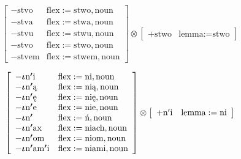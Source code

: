 \documentclass{article}
\begin{document}
\begin{scriptsize}\[
\left[\begin{array}{ll}
-\text{stvo} & \text{flex}:=\text{stwo}, \text{noun}\\
-\text{stva} & \text{flex}:=\text{stwa}, \text{noun}\\
-\text{stvu} & \text{flex}:=\text{stwu}, \text{noun}\\
-\text{stvo} & \text{flex}:=\text{stwo}, \text{noun}\\
-\text{stvem} & \text{flex}:=\text{stwem}, \text{noun}
\end{array}\right] \otimes \left[\begin{array}{ll}
+\text{stwo} & \text{lemma}:=\text{stwo}
\end{array}\right]
\]\end{scriptsize}

\begin{scriptsize}\[
\left[\begin{array}{ll}
-\text{\boldmath$\iota$n$'$i} & \text{flex}:=\text{ni}, \text{noun}\\
-\text{\boldmath$\iota$n$'$ą} & \text{flex}:=\text{nią}, \text{noun}\\
-\text{\boldmath$\iota$n$'$ę} & \text{flex}:=\text{nię}, \text{noun}\\
-\text{\boldmath$\iota$n$'$e} & \text{flex}:=\text{nie}, \text{noun}\\
-\text{\boldmath$\iota$n$'$} & \text{flex}:=\text{ń}, \text{noun}\\
-\text{\boldmath$\iota$n$'$ax} & \text{flex}:=\text{niach}, \text{noun}\\
-\text{\boldmath$\iota$n$'$om} & \text{flex}:=\text{niom}, \text{noun}\\
-\text{\boldmath$\iota$n$'$am$'$i} & \text{flex}:=\text{niami}, \text{noun}
\end{array}\right] \otimes \left[\begin{array}{ll}
+\text{n$'$i} & \text{lemma}:=\text{ni}
\end{array}\right]
\]\end{scriptsize}
\end{document}

